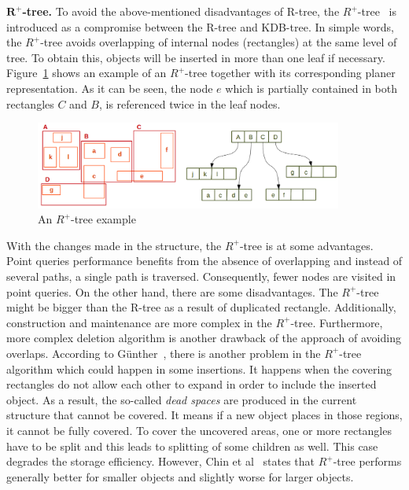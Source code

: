 \documentclass[a4paper,12pt]{article}
\begin{document}
\textbf{$\boldsymbol{R^+}$-tree.}
To avoid the above-mentioned disadvantages of R-tree, the $R^+$-tree~\cite{Sellis:rplustree} is introduced as a compromise between the R-tree and KDB-tree. In simple words, the $R^+$-tree avoids overlapping of internal nodes (rectangles) at the same level of tree. To obtain this, objects will be inserted in more than one leaf if necessary. Figure~\ref{r+tree} shows an example of an $R^+$-tree together with its corresponding planer representation. As it can be seen, the node $e$ which is partially contained in both rectangles $C$ and $B$, is referenced twice in the leaf nodes.


\begin{figure}
\centering
\includegraphics[width=0.9\textwidth]{r+tree}
\caption{An {$R^+$-tree} example}
\label{r+tree}
\end{figure}

With the changes made in the structure, the $R^+$-tree is at some advantages. Point queries performance benefits from the absence of overlapping and instead of several paths, a single path is traversed. Consequently, fewer nodes are visited in point queries. On the other hand, there are some disadvantages. 
The {$R^+$-tree} might be bigger than the R-tree as a result of duplicated rectangle. Additionally, construction and maintenance are more complex in the {$R^+$-tree}. Furthermore, more complex deletion algorithm is another drawback of the approach of avoiding overlaps.  
According to G{\"u}nther~\cite{efficientstruct}, there is another problem in the {$R^+$-tree} algorithm which could happen in some insertions. It happens when the covering rectangles do not allow each other to expand in order to include the inserted object. As a result, the so-called \textit{dead spaces} are produced in the current structure that cannot be covered. It means if a new object places in those regions, it cannot be fully covered. To cover the uncovered areas, one or more rectangles have to be split and this leads to splitting of some children as well. This case degrades the storage efficiency. However, Chin et al~\cite{survey} states that {$R^+$-tree} performs generally better for smaller objects and slightly worse for larger objects.
\end{document}
